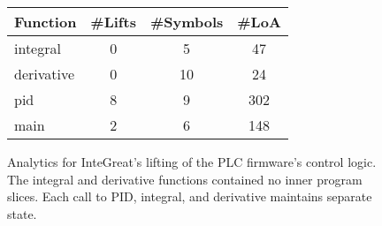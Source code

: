 
\begin{figure}
    \centering
% 
% 
% 
\begin{tabular}{ |l|ccc| } 
 \hline
  Function & \#Lifts & \#Symbols & \#LoA \\ [1ex] 
 \hline
 \hline
  integral & 0 & 5 & 47 \\ [0.5ex] 
  derivative & 0 & 10 & 24 \\ [0.5ex] 
  pid & 8 & 9 & 302 \\ [0.5ex] 
  main & 2 & 6 & 148 \\ [0.5ex] 
 \hline
\end{tabular}
\label{fig:table-plc}
	\caption{Analytics for InteGreat's lifting of the PLC firmware's control logic. The integral and derivative functions contained no inner program slices. Each call to PID, integral, and derivative maintains separate state.}
	\label{fig:plc-stats}
\end{figure}

